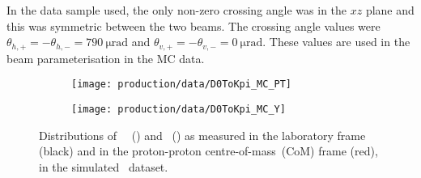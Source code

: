 In the data sample used, the only non-zero crossing angle was in the $xz$ plane 
and this was symmetric between the two beams.
The crossing angle values were $\theta_{h,+} = -\theta_{h,-} = 
\SI{790}{\micro\radian}$ and $\theta_{v,+} = -\theta_{v,-} = 
\SI{0}{\micro\radian}$.
These values are used in the beam parameterisation in the \ac{MC} data.

\begin{figure}
  \begin{subfigure}[b]{0.5\textwidth}
    \centering
    \texttt{[image: production/data/D0ToKpi\_MC\_PT]}
    \caption{\pT}
    \label{fig:prod:data:com_boost:pt}
  \end{subfigure}
  \begin{subfigure}[b]{0.5\textwidth}
    \centering
    \texttt{[image: production/data/D0ToKpi\_MC\_Y]}
    \caption{\rapidity}
    \label{fig:prod:data:com_boost:y}
  \end{subfigure}
  \caption{%
    Distributions of \PDzero\ \pT~() and 
    \rapidity~() as measured in the 
    laboratory frame (black) and in the proton-proton centre-of-mass~(CoM) 
    frame (red), in the simulated \DzToKpi\ dataset.
  }
  \label{fig:prod:data:com_boost}
\end{figure}
